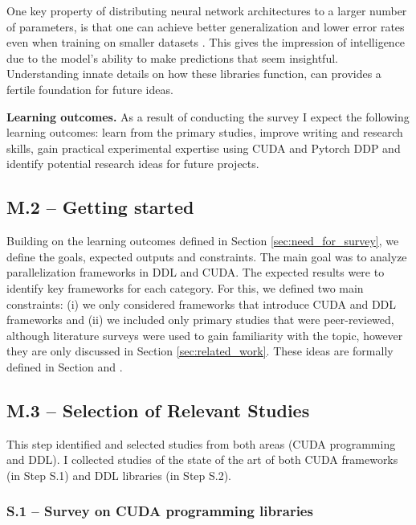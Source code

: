 One key property of distributing neural network architectures to a larger number of parameters, is
that one can achieve better generalization and lower error rates even when training on smaller
datasets \cite{kaplan_scaling_2020}. This gives the impression of intelligence due to the model's
ability to make predictions that seem insightful. Understanding innate details on how these
libraries function, can provides a fertile foundation for future ideas.

\textbf{Learning outcomes.}
As a result of conducting the survey I expect the following learning outcomes: learn from the primary
studies, improve writing and research skills, gain practical experimental expertise using CUDA and
Pytorch DDP and identify potential research ideas for future projects.

\subsection{M.2 -- Getting started}
\label{sec:research_questions}
Building on the learning outcomes defined in Section \ref{sec:need_for_survey}, we define
the goals, expected outputs and constraints. The main goal was to analyze parallelization frameworks in DDL and CUDA.
The expected results were to identify key frameworks for each category. For this, we defined two main constraints: (i)
we only considered frameworks that introduce CUDA and DDL frameworks and (ii) we included only primary
studies that were peer-reviewed, although literature surveys were used to gain familiarity with the topic,
however they are only discussed in Section \ref{sec:related_work}. These ideas are formally defined
in Section  and .

\subsection{M.3 -- Selection of Relevant Studies}
This step identified and selected studies from both areas (CUDA programming and DDL). I collected
studies of the state of the art of both CUDA frameworks (in Step S.1) and DDL libraries (in Step
S.2).

\subsubsection{S.1 -- Survey on CUDA programming libraries}
